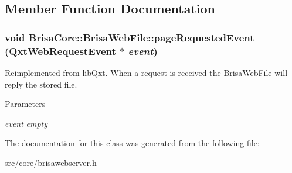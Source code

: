 \subsection{Member Function Documentation}
\hypertarget{classBrisaCore_1_1BrisaWebFile_ae86d95d03f7d1d3c0acc4bc9cd7a3fac}{
\subsubsection[{pageRequestedEvent}]{\setlength{\rightskip}{0pt plus 5cm}void BrisaCore::BrisaWebFile::pageRequestedEvent (QxtWebRequestEvent $\ast$ {\em event})}}
\label{classBrisaCore_1_1BrisaWebFile_ae86d95d03f7d1d3c0acc4bc9cd7a3fac}


Reimplemented from libQxt. When a request is received the \hyperlink{classBrisaCore_1_1BrisaWebFile}{BrisaWebFile} will reply the stored file.


\begin{DoxyParams}{Parameters}
\item[{\em event}]{\itshape empty\/} \end{DoxyParams}


The documentation for this class was generated from the following file:\begin{DoxyCompactItemize}
\item 
src/core/\hyperlink{brisawebserver_8h}{brisawebserver.h}\end{DoxyCompactItemize}
